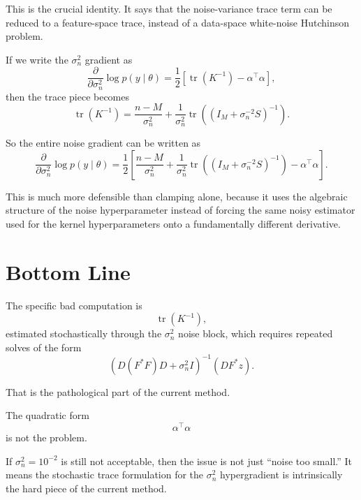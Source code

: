 \documentclass[11pt]{article}
\begin{document}
This is the crucial identity. It says that the noise-variance trace term can be
reduced to a feature-space trace, instead of a data-space white-noise
Hutchinson problem.

If we write the $\sigma_n^2$ gradient as
\begin{equation}
\frac{\partial}{\partial \sigma_n^2} \log p(y \mid \theta)
=
\frac{1}{2}
\left[
\operatorname{tr}(K^{-1}) - \alpha^\top \alpha
\right],
\end{equation}
then the trace piece becomes
\begin{equation}
\operatorname{tr}(K^{-1})
=
\frac{n-M}{\sigma_n^2}
+
\frac{1}{\sigma_n^2}
\operatorname{tr}\!\left(\left(I_M + \sigma_n^{-2} S\right)^{-1}\right).
\end{equation}

So the entire noise gradient can be written as
\begin{equation}
\frac{\partial}{\partial \sigma_n^2} \log p(y \mid \theta)
=
\frac{1}{2}
\left[
\frac{n-M}{\sigma_n^2}
+
\frac{1}{\sigma_n^2}
\operatorname{tr}\!\left(\left(I_M + \sigma_n^{-2} S\right)^{-1}\right)
- \alpha^\top \alpha
\right].
\end{equation}

This is much more defensible than clamping alone, because it uses the algebraic
structure of the noise hyperparameter instead of forcing the same noisy
estimator used for the kernel hyperparameters onto a fundamentally different
derivative.

\section*{Bottom Line}

The specific bad computation is
\begin{equation}
\operatorname{tr}(K^{-1}),
\end{equation}
estimated stochastically through the $\sigma_n^2$ noise block, which requires
repeated solves of the form
\begin{equation}
\left(D(F^\ast F)D + \sigma_n^2 I\right)^{-1}(D F^\ast z).
\end{equation}

That is the pathological part of the current method.

The quadratic form
\begin{equation}
\alpha^\top \alpha
\end{equation}
is not the problem.

If $\sigma_n^2 = 10^{-2}$ is still not acceptable, then the issue is not just
``noise too small.'' It means the stochastic trace formulation for the
$\sigma_n^2$ hypergradient is intrinsically the hard piece of the current
method.
\end{document}
